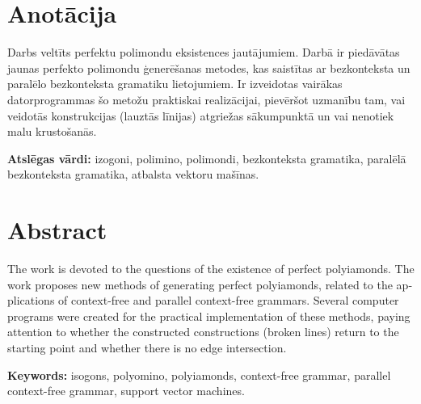 \documentclass[utf8]{ludis2022}
\begin{document}
\maketitle
\newpage



\section*{Anotācija}

\firstparskip Darbs veltīts perfektu polimondu eksistences jautājumiem.
Darbā ir piedāvātas jaunas perfekto polimondu ģenerēšanas metodes, kas saistītas ar 
bezkonteksta un paralēlo bezkonteksta gramatiku lietojumiem.  Ir izveidotas vairākas datorprogrammas šo metožu praktiskai realizācijai, pievēršot uzmanību tam, vai veidotās konstrukcijas (lauztās līnijas) atgriežas sākumpunktā un vai nenotiek malu krustošanās.


\vspace{0.5cm}
\textbf{Atslēgas vārdi:} izogoni, polimino, polimondi, bezkonteksta gramatika, paralēlā bezkonteksta gramatika, atbalsta vektoru mašīnas.


\newpage

\section*{Abstract}
\begin{english}

\firstparskip The work is devoted to the questions of the existence of perfect polyiamonds.
The work proposes new methods of generating perfect polyiamonds, related to the applications of
context-free and parallel context-free grammars. Several computer programs were created for the practical implementation of these methods, paying attention to whether the constructed constructions (broken lines) return to the starting point and whether there is no edge intersection.

\vspace{0.25cm}
\textbf{Keywords:} isogons, polyomino, polyiamonds, context-free grammar, parallel context-free grammar, support vector machines.

\end{english}

\newpage

\renewcommand{\contentsname}{Satura rādītājs}
\tableofcontents

\newpage
{}


\end{document}
